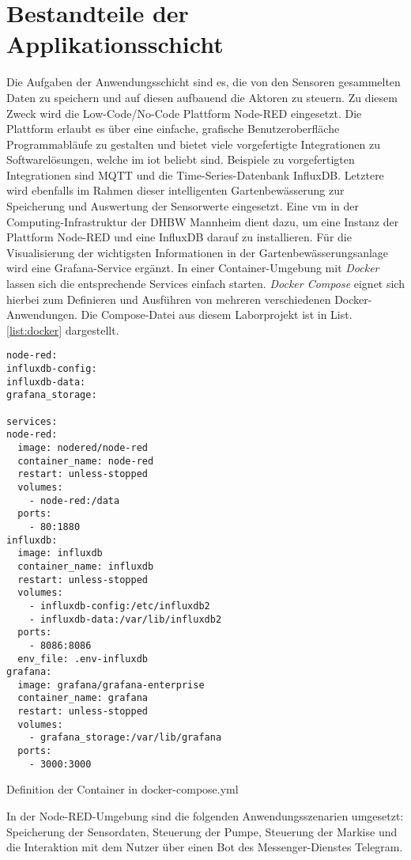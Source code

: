 
\section{Bestandteile der Applikationsschicht}

Die Aufgaben der Anwendungsschicht sind es, die von den Sensoren gesammelten Daten zu speichern und auf diesen aufbauend die Aktoren zu steuern.
Zu diesem Zweck wird die Low-Code/No-Code Plattform Node-RED eingesetzt. Die Plattform erlaubt es über eine einfache, grafische Benutzeroberfläche Programmabläufe zu gestalten und bietet viele vorgefertigte Integrationen zu Softwarelösungen, welche im \gls{iot} beliebt sind.
Beispiele zu vorgefertigten Integrationen sind MQTT und die Time-Series-Datenbank InfluxDB.
Letztere wird ebenfalls im Rahmen dieser intelligenten Gartenbewässerung zur Speicherung und Auswertung der Sensorwerte eingesetzt. Eine \gls{vm} in der Computing-Infrastruktur der DHBW Mannheim dient dazu, um eine Instanz der Plattform Node-RED und eine InfluxDB darauf zu installieren. Für die Visualisierung der wichtigsten Informationen in der Gartenbewässerungsanlage wird eine Grafana-Service ergänzt. 
In einer Container-Umgebung mit \textit{Docker} lassen sich die entsprechende Services einfach starten. \textit{Docker Compose} eignet sich hierbei zum Definieren und Ausführen von mehreren verschiedenen Docker-Anwendungen. Die Compose-Datei aus diesem Laborprojekt ist in List. \ref{list:docker} dargestellt.

\begin{listing}[!ht]
\begin{verbatim}
node-red:
influxdb-config:
influxdb-data:
grafana_storage:

services:
node-red:
  image: nodered/node-red
  container_name: node-red
  restart: unless-stopped
  volumes:
    - node-red:/data
  ports:
    - 80:1880
influxdb:
  image: influxdb
  container_name: influxdb
  restart: unless-stopped
  volumes:
    - influxdb-config:/etc/influxdb2
    - influxdb-data:/var/lib/influxdb2
  ports:
    - 8086:8086
  env_file: .env-influxdb
grafana:
  image: grafana/grafana-enterprise
  container_name: grafana
  restart: unless-stopped
  volumes:
    - grafana_storage:/var/lib/grafana
  ports:
    - 3000:3000
\end{verbatim}
\caption{Definition der Container in docker-compose.yml}
\label{list:docker}
\end{listing}  

In der Node-RED-Umgebung sind die folgenden Anwendungsszenarien umgesetzt: Speicherung der Sensordaten, Steuerung der Pumpe, Steuerung der Markise und die Interaktion mit dem Nutzer über einen Bot des Messenger-Dienstes Telegram.

